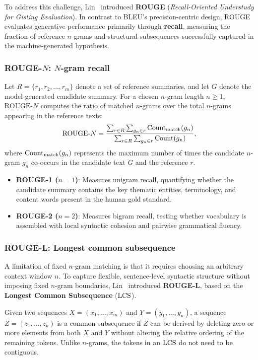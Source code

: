 \documentclass[../../main.tex]{subfiles}
\begin{document}
To address this challenge, Lin~\cite{lin2004rouge} introduced \textbf{ROUGE} (\textit{Recall-Oriented Understudy for Gisting Evaluation}). In contrast to BLEU's precision-centric design, ROUGE evaluates generative performance primarily through \textbf{recall}, measuring the fraction of reference $n$-grams and structural subsequences successfully captured in the machine-generated hypothesis.

\subsubsection{ROUGE-$N$: $N$-gram recall}
Let $R = \{r_1, r_2, \dots, r_m\}$ denote a set of reference summaries, and let $G$ denote the model-generated candidate summary. For a chosen $n$-gram length $n \ge 1$, $\text{ROUGE-}N$ computes the ratio of matched $n$-grams over the total $n$-grams appearing in the reference texts:
\begin{equation}
\label{eq:rouge_n_def}
\text{ROUGE-}N = \frac{\sum_{r \in R} \sum_{g_n \in r} \operatorname{Count}_{\text{match}}(g_n)}{\sum_{r \in R} \sum_{g_n \in r} \operatorname{Count}(g_n)},
\end{equation}
where $\operatorname{Count}_{\text{match}}(g_n)$ represents the maximum number of times the candidate $n$-gram $g_n$ co-occurs in the candidate text $G$ and the reference $r$.
\begin{itemize}
    \item \textbf{ROUGE-1 ($n=1$)}: Measures unigram recall, quantifying whether the candidate summary contains the key thematic entities, terminology, and content words present in the human gold standard.
    \item \textbf{ROUGE-2 ($n=2$)}: Measures bigram recall, testing whether vocabulary is assembled with local syntactic cohesion and pairwise grammatical fluency.
\end{itemize}

\subsubsection{ROUGE-L: Longest common subsequence}
A limitation of fixed $n$-gram matching is that it requires choosing an arbitrary context window $n$. To capture flexible, sentence-level syntactic structure without imposing fixed $n$-gram boundaries, Lin~\cite{lin2004rouge} introduced \textbf{ROUGE-L}, based on the \textbf{Longest Common Subsequence} ($\operatorname{LCS}$).

Given two sequences $X = (x_1, \dots, x_m)$ and $Y = (y_1, \dots, y_n)$, a sequence $Z = (z_1, \dots, z_k)$ is a common subsequence if $Z$ can be derived by deleting zero or more elements from both $X$ and $Y$ without altering the relative ordering of the remaining tokens. Unlike $n$-grams, the tokens in an $\operatorname{LCS}$ do not need to be contiguous.
\end{document}
